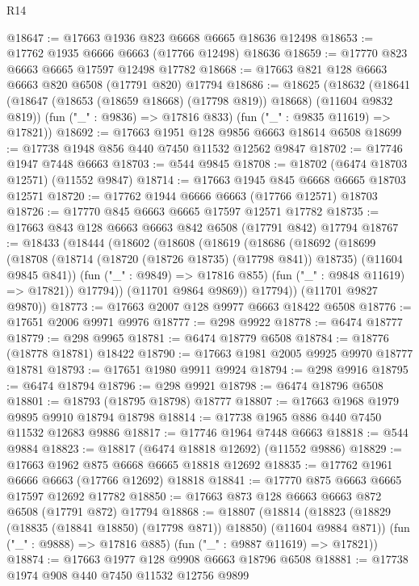 \begin{lexlean}{R14}
\begin{coremodule}
@18647 := @17663 @1936 @823 @6668 @6665 @18636 @12498
@18653 := @17762 @1935 @6666 @6663 (@17766 @12498) @18636
@18659 := @17770 @823 @6663 @6665 @17597 @12498 @17782
@18668 := @17663 @821 @128 @6663 @6663 @820 @6508 (@17791 @820) @17794
@18686 := @18625
    (@18632
      (@18641 (@18647 (@18653 (@18659 @18668) (@17798 @819)) @18668) (@11604 @9832 @819))
      (fun ("_" : @9836) => @17816 @833)
      (fun ("_" : @9835 @11619) => @17821))
@18692 := @17663 @1951 @128 @9856 @6663 @18614 @6508
@18699 := @17738 @1948 @856 @440 @7450 @11532 @12562 @9847
@18702 := @17746 @1947 @7448 @6663
@18703 := @544 @9845
@18708 := @18702 (@6474 @18703 @12571) (@11552 @9847)
@18714 := @17663 @1945 @845 @6668 @6665 @18703 @12571
@18720 := @17762 @1944 @6666 @6663 (@17766 @12571) @18703
@18726 := @17770 @845 @6663 @6665 @17597 @12571 @17782
@18735 := @17663 @843 @128 @6663 @6663 @842 @6508 (@17791 @842) @17794
@18767 := @18433
    (@18444
      (@18602
        (@18608
          (@18619
            (@18686
              (@18692
                (@18699
                  (@18708
                    (@18714 (@18720 (@18726 @18735) (@17798 @841)) @18735)
                    (@11604 @9845 @841))
                  (fun ("_" : @9849) => @17816 @855)
                  (fun ("_" : @9848 @11619) => @17821))
                @17794))
            (@11701 @9864 @9869))
          @17794))
      (@11701 @9827 @9870))
@18773 := @17663 @2007 @128 @9977 @6663 @18422 @6508
@18776 := @17651 @2006 @9971 @9976
@18777 := @298 @9922
@18778 := @6474 @18777
@18779 := @298 @9965
@18781 := @6474 @18779 @6508
@18784 := @18776 (@18778 @18781) @18422
@18790 := @17663 @1981 @2005 @9925 @9970 @18777 @18781
@18793 := @17651 @1980 @9911 @9924
@18794 := @298 @9916
@18795 := @6474 @18794
@18796 := @298 @9921
@18798 := @6474 @18796 @6508
@18801 := @18793 (@18795 @18798) @18777
@18807 := @17663 @1968 @1979 @9895 @9910 @18794 @18798
@18814 := @17738 @1965 @886 @440 @7450 @11532 @12683 @9886
@18817 := @17746 @1964 @7448 @6663
@18818 := @544 @9884
@18823 := @18817 (@6474 @18818 @12692) (@11552 @9886)
@18829 := @17663 @1962 @875 @6668 @6665 @18818 @12692
@18835 := @17762 @1961 @6666 @6663 (@17766 @12692) @18818
@18841 := @17770 @875 @6663 @6665 @17597 @12692 @17782
@18850 := @17663 @873 @128 @6663 @6663 @872 @6508 (@17791 @872) @17794
@18868 := @18807
    (@18814
      (@18823 (@18829 (@18835 (@18841 @18850) (@17798 @871)) @18850) (@11604 @9884 @871))
      (fun ("_" : @9888) => @17816 @885)
      (fun ("_" : @9887 @11619) => @17821))
@18874 := @17663 @1977 @128 @9908 @6663 @18796 @6508
@18881 := @17738 @1974 @908 @440 @7450 @11532 @12756 @9899

\end{coremodule}
\end{lexlean}
